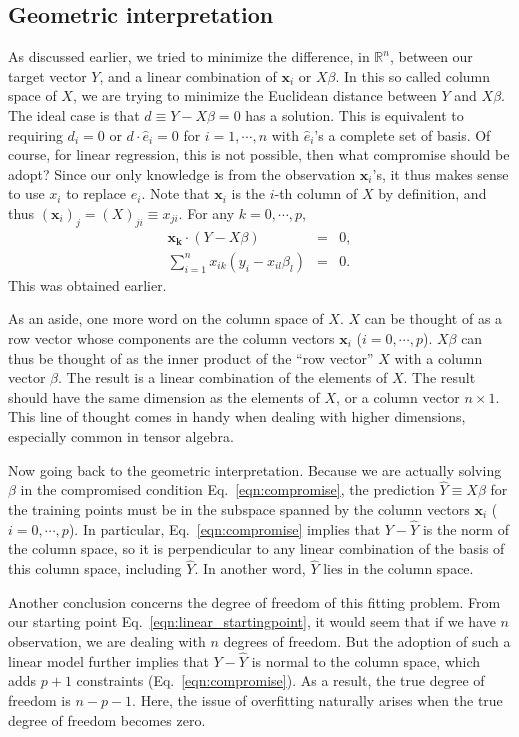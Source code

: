 \subsection{Geometric interpretation}
As discussed earlier, we tried to minimize the difference, in $\mathbb{R}^n$, between our target vector $Y$, and a linear combination of $\mathbf{x}_i$ or $X\beta$. In this so called column space of $X$, we are trying to minimize the Euclidean distance between $Y$ and $X\beta$. The ideal case is that $d\equiv Y-X\beta=0$ has a solution. This is equivalent to requiring $d_i=0$ or $d\cdot \hat e_i=0$ for $i=1,\cdots, n$ with $\hat e_i$'s a complete set of basis. Of course, for linear regression, this is not possible, then what compromise should be adopt? Since our only knowledge is from the observation $\mathbf{x}_i$'s, it thus makes sense to use $x_{i}$ to replace $\hat e_i$. Note that $\mathbf{x}_i$ is the $i$-th column of $X$ by definition, and thus $(\mathbf{x}_i)_j=(X)_{ji}\equiv x_{ji}$. For any $k=0,\cdots,p$,
\begin{eqnarray}
\mathbf{x_k}\cdot(Y-X\beta) &=& 0, \label{eqn:compromise} \\
\sum_{i=1}^{n}x_{ik}(y_i-x_{il}\beta_l) &=& 0.
\end{eqnarray}
This was obtained earlier.

As an aside, one more word on the column space of $X$. $X$ can be thought of as a row vector whose components are the column vectors $\mathbf{x}_i$ ($i=0,\cdots,p$). $X\beta$ can thus be thought of as the inner product of the ``row vector'' $X$ with a column vector $\beta$. The result is a linear combination of the elements of $X$. The result should have the same dimension as the elements of $X$, or a column vector $n\times1$. This line of thought comes in handy when dealing with higher dimensions, especially common in tensor algebra.

Now going back to the geometric interpretation. Because we are actually solving $\beta$ in the compromised condition Eq.~\ref{eqn:compromise}, the prediction $\hat{Y}\equiv X\beta$ for the training points must be in the subspace spanned by the column vectors $\mathbf{x}_i$ ($i=0,\cdots, p$). In particular, Eq.~\ref{eqn:compromise} implies that $Y-\hat{Y}$ is the norm of the column space, so it is perpendicular to any linear combination of the basis of this column space, including $\hat{Y}$. In another word, $\hat{Y}$ lies in the column space.

Another conclusion concerns the degree of freedom of this fitting problem. From our starting point Eq.~\ref{eqn:linear_startingpoint}, it would seem that if we have $n$ observation, we are dealing with $n$ degrees of freedom. But the adoption of such a linear model further implies that $Y-\hat{Y}$ is normal to the column space, which adds $p+1$ constraints (Eq.~\ref{eqn:compromise}). As a result, the true degree of freedom is $n-p-1$. Here, the issue of overfitting naturally arises when the true degree of freedom becomes zero.

